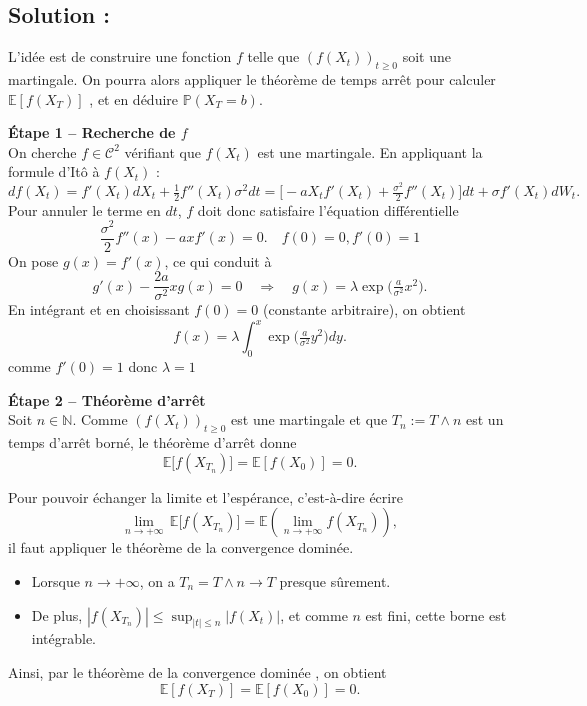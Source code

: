 \subsection*{Solution :}

L’idée est de construire une fonction $f$ telle que $(f(X_t))_{t\ge 0}$ soit une martingale.  
On pourra alors appliquer le théorème de temps arrêt pour calculer $\mathbb{E}[f(X_T)]$ , et en déduire $\mathbb{P}(X_T=b)$.

\medskip
\textbf{Étape 1 – Recherche de $f$}\\
On cherche $f\in \mathcal{C}^2$ vérifiant que $f(X_t)$ est une martingale.  
En appliquant la formule d’Itô à $f(X_t)$ :
\[
df(X_t)=f'(X_t)dX_t+\tfrac{1}{2}f''(X_t)\sigma^2 dt
      =\Big[-aX_t f'(X_t)+\tfrac{\sigma^2}{2}f''(X_t)\Big]dt
       +\sigma f'(X_t)dW_t.
\]
Pour annuler le terme en $dt$, $f$ doit donc satisfaire l’équation différentielle
\[
\frac{\sigma^2}{2}f''(x)-a x f'(x)=0. \quad f(0) = 0 , f'(0) = 1
\]
On pose $g(x)=f'(x)$, ce qui conduit à
\[
g'(x)-\frac{2a}{\sigma^2}x g(x)=0
\quad\Longrightarrow\quad
g(x)=\lambda \exp\!\Big(\tfrac{a}{\sigma^2}x^2\Big).
\]
En intégrant et en choisissant $f(0)=0$ (constante arbitraire), on obtient
\[
f(x)=\lambda \int_0^x \exp\!\Big(\tfrac{a}{\sigma^2} y^2\Big)dy.
\]
comme $f'(0) = 1$ donc $\lambda=1$


\medskip
\textbf{Étape 2 – Théorème d’arrêt}\\

Soit $n \in \mathbb{N}$.  
Comme $(f(X_t))_{t\geq 0}$ est une martingale et que $T_n := T \wedge n$ est un temps d'arrêt borné, le théorème d’arrêt donne
\[
\mathbb{E}\big[f(X_{T_n})\big] = \mathbb{E}[f(X_0)] = 0.
\]

Pour pouvoir échanger la limite et l’espérance, c’est-à-dire écrire
\[
\lim_{n \to +\infty} \, \mathbb{E}\big[f(X_{T_n})\big] 
= \mathbb{E}\!\left(\lim_{n \to +\infty} f(X_{T_n})\right),
\]
il faut appliquer le théorème de la convergence dominée.

\begin{itemize}
  \item Lorsque $n \to +\infty$, on a $T_n = T \wedge n \to T$ presque sûrement.
  \item De plus, $|f(X_{T_n})| \leq \sup_{|t|\leq n} |f(X_t)|$, et comme $n$ est fini, cette borne est intégrable.
\end{itemize}

Ainsi, par le théorème de la convergence dominée , on obtient
\[
\mathbb{E}[f(X_T)] = \mathbb{E}[f(X_0)] = 0.
\]



